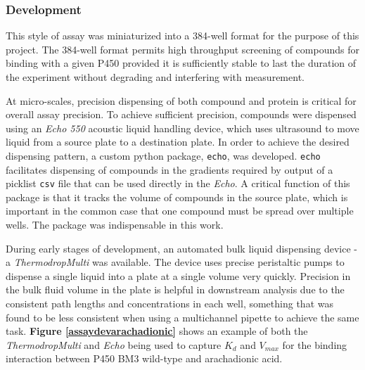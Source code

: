 \documentclass{article}
\begin{document}

\subsubsection{Development}

This style of assay was miniaturized into a 384-well format for the purpose of this project.
The 384-well format permits high throughput screening of compounds for binding with a given P450 provided it is sufficiently stable to last the duration of the experiment without degrading and interfering with measurement.

At micro-scales, precision dispensing of both compound and protein is critical for overall assay precision.
To achieve sufficient precision, compounds were dispensed using an \textit{Echo 550} acoustic liquid handling device, which uses ultrasound to move liquid from a source plate to a destination plate.
In order to achieve the desired dispensing pattern, a custom python package, \texttt{echo}, was developed.
\texttt{echo} facilitates dispensing of compounds in the gradients required by output of a picklist \texttt{csv} file that can be used directly in the \textit{Echo}.
A critical function of this package is that it tracks the volume of compounds in the source plate, which is important in the common case that one compound must be spread over multiple wells.
The package was indispensable in this work.


During early stages of development, an automated bulk liquid dispensing device - a \textit{ThermodropMulti} was available.
The device uses precise peristaltic pumps to dispense a single liquid into a plate at a single volume very quickly.
Precision in the bulk fluid volume in the plate is helpful in downstream analysis due to the consistent path lengths and concentrations in each well, something that was found to be less consistent when using a multichannel pipette to achieve the same task.
\textbf{Figure \ref{assaydevarachadionic}} shows an example of both the \textit{ThermodropMulti} and \textit{Echo} being used to capture $K_d$ and $V_{max}$ for the binding interaction between P450 BM3 wild-type and arachadionic acid.
\end{document}
